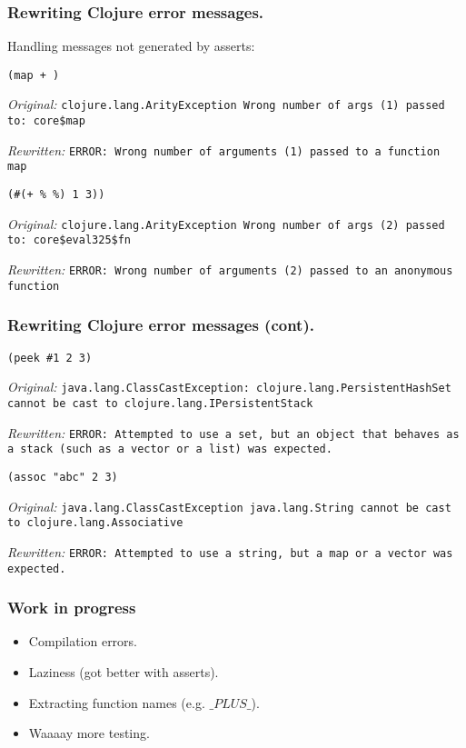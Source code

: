 \documentclass{beamer}
\begin{document}
\begin{frame}[fragile]
  \frametitle{Rewriting Clojure error messages.}
Handling messages not generated by asserts:

\vspace{.1in}

{\tt (map + )}

{\it Original:}
{\tt clojure.lang.ArityException Wrong number of args (1) passed to: core\$map}

{\it Rewritten:}
{\tt ERROR: Wrong number of arguments (1)  passed to a function map}

\vspace{.1in}

{\tt (\#(+ \% \%) 1 3))}

{\it Original:}
{\tt clojure.lang.ArityException Wrong number of args (2) passed to: core\$eval325\$fn}

{\it Rewritten:}
{\tt ERROR: Wrong number of arguments (2)  passed to an anonymous function}
 
\end{frame}

\begin{frame}[fragile]
  \frametitle{Rewriting Clojure error messages (cont).}

{\tt (peek \#{1 2 3})}

{\it Original:}
{\tt java.lang.ClassCastException: clojure.lang.PersistentHashSet cannot be cast to clojure.lang.IPersistentStack}

{\it Rewritten:}
{\tt ERROR: Attempted to use a set, but an object that behaves as a stack (such as a vector or a list) was expected.}

\vspace{.1in}

{\tt (assoc "abc" 2 3)}

{\it Original:}
{\tt  java.lang.ClassCastException java.lang.String cannot be cast to clojure.lang.Associative}

{\it Rewritten:}
{\tt ERROR: Attempted to use a string, but a map or a vector was expected.}
\end{frame}

\begin{frame}
  \frametitle{Work in progress}
\begin{itemize}
\item Compilation errors.
\item Laziness (got better with asserts). 
\item Extracting function names (e.g. $\_PLUS\_$).
\item Waaaay more testing. 
\end{itemize}
\end{frame}
\end{document}
